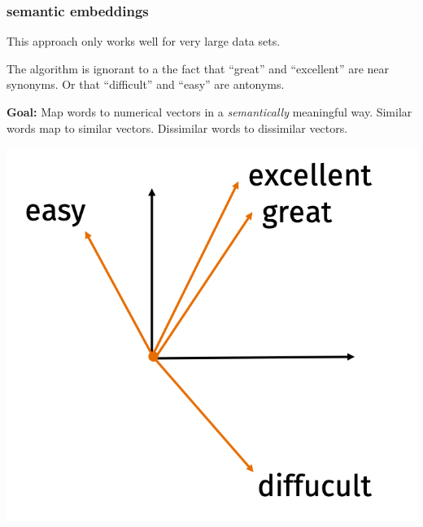 \documentclass[handout,compress]{beamer}
\begin{document}
\begin{frame}
	\frametitle{semantic embeddings}
	\small
	\begin{center}
		This approach only works well for very large data sets. 
	\end{center}
	The algorithm is ignorant to a the fact that ``great'' and ``excellent'' are near synonyms. Or that ``difficult'' and ``easy'' are antonyms.
	
	\textbf{Goal:} Map words to numerical vectors in a \emph{semantically} meaningful way. Similar words map to similar vectors. Dissimilar words to dissimilar vectors.
	
	\begin{center}
		\includegraphics[width=.3\textwidth]{semantic_embedding.png}
	\end{center}
	
	
\end{frame}

\begin{frame}
	
	
\end{frame}
\end{document}
